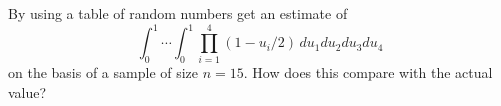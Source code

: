 By using a table of random numbers get an estimate of
$$\int_0^1 \cdots \int_0^1 \prod_{i=1}^{4} (1-u_i/2) \, du_1 du_2 du_3 du_4$$
on the basis of a sample of size $n = 15$. How does this compare with the actual value?
